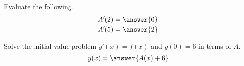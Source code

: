 \documentclass{ximera}
\begin{document}
\begin{exercise}
\begin{image}
\end{image}

Evaluate the following.
\begin{align*}
A'(2) &= \answer{0}\\
A'(5) &= \answer{2}
\end{align*}

Solve the initial value problem $y'(x) = f(x)$ and $y(0) = 6$ in terms of $A$.
\[
y(x) = \answer{A(x)+6}
\]

\end{exercise}
\end{document}
